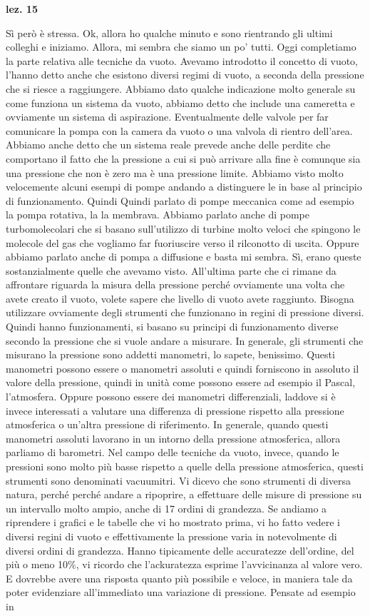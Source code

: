 \textbf{lez. 15}

Sì però è stressa. Ok, allora ho qualche minuto e sono rientrando gli ultimi colleghi e iniziamo. Allora, mi sembra che siamo un po' tutti. Oggi completiamo la parte relativa alle tecniche da vuoto. Avevamo introdotto il concetto di vuoto, l'hanno detto anche che esistono diversi regimi di vuoto, a seconda della pressione che si riesce a raggiungere. Abbiamo dato qualche indicazione molto generale su come funziona un sistema da vuoto, abbiamo detto che include una cameretta e ovviamente un sistema di aspirazione. Eventualmente delle valvole per far comunicare la pompa con la camera da vuoto o una valvola di rientro dell'area. Abbiamo anche detto che un sistema reale prevede anche delle perdite che comportano il fatto che la pressione a cui si può arrivare alla fine è comunque sia una pressione che non è zero ma è una pressione limite. Abbiamo visto molto velocemente alcuni esempi di pompe andando a distinguere le in base al principio di funzionamento. Quindi Quindi parlato di pompe meccanica come ad esempio la pompa rotativa, la la membrava. Abbiamo parlato anche di pompe turbomolecolari che si basano sull'utilizzo di turbine molto veloci che spingono le molecole del gas che vogliamo far fuoriuscire verso il rilconotto di uscita. Oppure abbiamo parlato anche di pompa a diffusione e basta mi sembra. Sì, erano queste sostanzialmente quelle che avevamo visto. All'ultima parte che ci rimane da affrontare riguarda la misura della pressione perché ovviamente una volta che avete creato il vuoto, volete sapere che livello di vuoto avete raggiunto. Bisogna utilizzare ovviamente degli strumenti che funzionano in regini di pressione diversi. Quindi hanno funzionamenti, si basano su principi di funzionamento diverse secondo la pressione che si vuole andare a misurare. In generale, gli strumenti che misurano la pressione sono addetti manometri, lo sapete, benissimo. Questi manometri possono essere o manometri assoluti e quindi forniscono in assoluto il valore della pressione, quindi in unità come possono essere ad esempio il Pascal, l'atmosfera. Oppure possono essere dei manometri differenziali, laddove si è invece interessati a valutare una differenza di pressione rispetto alla pressione atmosferica o un'altra pressione di riferimento. In generale, quando questi manometri assoluti lavorano in un intorno della pressione atmosferica, allora parliamo di barometri. Nel campo delle tecniche da vuoto, invece, quando le pressioni sono molto più basse rispetto a quelle della pressione atmosferica, questi strumenti sono denominati vacuumitri. Vi dicevo che sono strumenti di diversa natura, perché perché andare a ripoprire, a effettuare delle misure di pressione su un intervallo molto ampio, anche di 17 ordini di grandezza. Se andiamo a riprendere i grafici e le tabelle che vi ho mostrato prima, vi ho fatto vedere i diversi regini di vuoto e effettivamente la pressione varia in notevolmente di diversi ordini di grandezza. Hanno tipicamente delle accuratezze dell'ordine, del più o meno 10\%, vi ricordo che l'ackuratezza esprime l'avvicinanza al valore vero. E dovrebbe avere una risposta quanto più possibile e veloce, in maniera tale da poter evidenziare all'immediato una variazione di pressione. Pensate ad esempio in 
